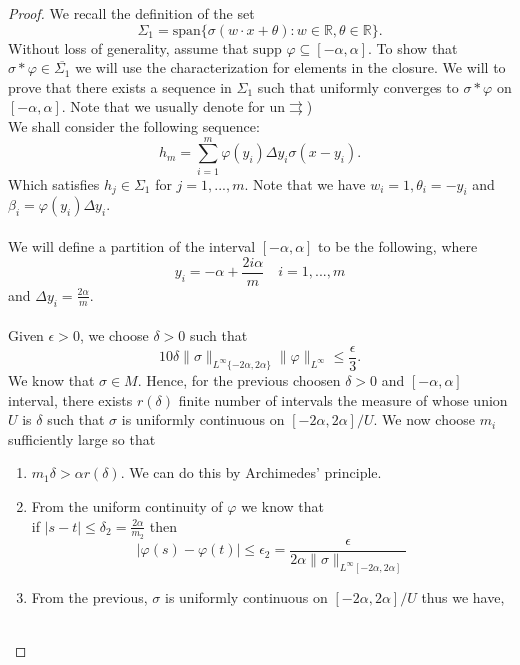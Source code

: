 \documentclass[../main.tex]{subfiles}
\begin{document}
	\begin{proof} %
		We recall the definition of the set 
		\begin{equation}
			\Sigma_1 = \text{span} \{ {\sigma(w\cdot x + \theta) : w\in \mathbb{R}, \theta \in \mathbb{R} \} }.
			\tag{1}
		\end{equation}
	Without loss of generality, assume that $\text{supp }\varphi \subseteq [-\alpha,\alpha] $.
	To show that $\sigma \ast \varphi \in \overline{\Sigma_1} $ we will use the characterization for elements in the closure. We will to prove that there exists a sequence in $\Sigma_1$ such that uniformly converges to $\sigma \ast \varphi$ on $[-\alpha,\alpha]$. Note that we usually denote for un$\rightrightarrows$) \\ 
	
	\noindent We shall consider the following sequence: 
		$$h_m= \sum_{i=1}^m\varphi(y_i)\Delta y_i \sigma(x-y_i).$$ 
		Which satisfies $h_j\in \Sigma_1$ for $j=1,...,m$. Note that we have $w_i=1,\theta_i=-y_i$ and $  \beta_i=\varphi(y_i)\Delta y_i$.\\ \\ 
		
		\noindent We will define a partition of the interval $[-\alpha,\alpha]$ to be the following, where $$y_i=-\alpha + \frac{2i\alpha}{m}\quad i=1,...,m$$ and $\Delta y_i=\frac{2\alpha}{m}$. \\ \\
		Given $\epsilon >0$, we choose $\delta >0$ such that $$10\delta \| \sigma\|_{L^\infty\{-2\alpha,2\alpha\}}\|\varphi \|_{L^\infty} \leq \frac{\epsilon}{3}.$$
		We know that $\sigma \in M$. Hence, for the previous choosen $\delta>0$ and $[-\alpha,\alpha]$ interval, there exists $r(\delta)$ finite number of intervals the measure of whose union $U$ is $\delta$ such that $\sigma$ is uniformly continuous on $[-2\alpha,2\alpha]/U$. We now choose $m_i$ sufficiently large so that
		\begin{enumerate}
			\item $m_1 \delta > \alpha r(\delta)$. We can do this by Archimedes' principle.
			\item From the uniform continuity of $\varphi$ we know that \\
			
			if $|s-t| \leq \delta_2= \frac{2 \alpha }{m_2}$ then $$|\varphi(s)- \varphi(t)| \leq \epsilon_2= \frac{\epsilon}{2 \alpha \| \sigma\|_{L^\infty[-2\alpha,2\alpha]}}$$
			\item From the previous, $\sigma$ is uniformly continuous on  $[-2\alpha,2\alpha]/ U$ thus we have,\\ 
			 

\end{enumerate}
\end{proof}
\end{document}
